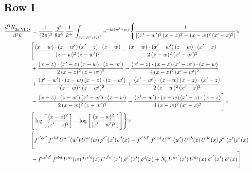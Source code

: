\documentclass[9pt]{article}
\numberwithin{equation}{section}
\begin{document}
\subsection{Row I}
\begin{align}
    \frac{d^{3}N_{2a\,\rm NLO}^{\rm}}{d^{3}k}  & =  \frac{1}{(2\pi)^{3}}\, \frac{g^{4}}{8\pi^{5}}\,\frac{1}{k^{+}}\,\int_{z,w,w^{\prime},x,x'}\, e^{-ik(w^{\prime}-w)}\, \Bigg\{ \frac{1}{\left[(x'-w')^{2}\, (x-z)^{2}-(x-w)^{2}\, (x'-z)^{2}\right]}\times\,\notag \\ & \Bigg[\frac{(x-w)\cdot (z-w')\, (x'-z)\cdot (z-w)}{(z-w)^{2}\,(z-w')^{2}}-\frac{(x-w)\cdot (x'-w')\, (z-w)\cdot (x'-z)}{2\, (z-w)^{2}\, (x'-w')^{2}}\notag \\ & + \frac{(x-z)\cdot (x'-z)\, (x-w)\cdot (z-w')}{2\, (x-z)^{2}\, (z-w')^{2}}-\frac{(x'-z)\cdot (x-z)\, (x'-w')\cdot (x-w)}{4\, (x-z)^{2}\, (x'-w')^{2}}\notag \\ & + \frac{(x'-w')\cdot (z-w)\, (x-z)\cdot (z-w')}{(z-w)^{2}\,(z-w')^{2}}+\frac{(x'-w')\cdot (z-w)\, (x-z)\cdot (x'-z)}{2\, (z-w)^{2}\, (x'-z)^{2}}\notag \\ & - \frac{(x-z)\cdot (z-w')\, (x'-w')\cdot (x-w)}{2\, (x-w)^{2}\, (z-w')^{2}} -\frac{(x'-w')\cdot (x-w)\, (x'-z)\cdot (x-z)}{4\, (x-w)^{2}\, (x'-z)^{2}}\Bigg]\times\notag \\ &  \Bigg[\log{\left[\frac{(x-z)^{2}}{ (x'-z)^{2}}\right]}-\log{\left[\frac{(x-w)^{2}}{(x'-w')^{2}}\right]}\Bigg]\Bigg\} \times\, \notag \\ & \Bigg[f^{c'bd'}\,f^{cbd}\, U^{ac'}(w')\,U^{ac}(w)\,\rho^{d'}(x')\rho^{d}(x)- f^{c'bd'}\,f^{acd}\,U^{ac'}(w')\,U^{cb}(z)\,U^{de}(x)\,\rho^{d'}(x')\rho^{e}(x) \notag \\ & -f^{ac'd'}\,f^{cbd}\,U^{ac}(w)\,U^{c'b}(z)\,U^{d'e'}(x')\,\rho^{e'}(x')\,\rho^{d}(x) +N_{c}\,U^{de'}(x')\,U^{de}(x)\,\rho^{e'}(x')\,\rho^{e}(x)\Bigg]
\end{align}
\end{document}
